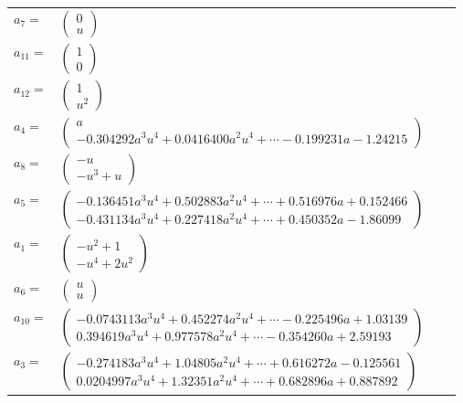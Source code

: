 \documentclass[1p]{elsarticle_modified}
\theoremstyle{definition}
\begin{document}
\begin{tabular}{m{7pt} m{180pt} m{7pt} m{180pt} }
\flushright $a_{7}=$&$\begin{pmatrix}0\\u\end{pmatrix}$ \\
\flushright $a_{11}=$&$\begin{pmatrix}1\\0\end{pmatrix}$ \\
\flushright $a_{12}=$&$\begin{pmatrix}1\\u^2\end{pmatrix}$ \\
\flushright $a_{4}=$&$\begin{pmatrix}a\\-0.304292 a^{3} u^{4}+0.0416400 a^{2} u^{4}+\cdots-0.199231 a-1.24215\end{pmatrix}$ \\
\flushright $a_{8}=$&$\begin{pmatrix}- u\\- u^3+u\end{pmatrix}$ \\
\flushright $a_{5}=$&$\begin{pmatrix}-0.136451 a^{3} u^{4}+0.502883 a^{2} u^{4}+\cdots+0.516976 a+0.152466\\-0.431134 a^{3} u^{4}+0.227418 a^{2} u^{4}+\cdots+0.450352 a-1.86099\end{pmatrix}$ \\
\flushright $a_{1}=$&$\begin{pmatrix}- u^2+1\\- u^4+2 u^2\end{pmatrix}$ \\
\flushright $a_{6}=$&$\begin{pmatrix}u\\u\end{pmatrix}$ \\
\flushright $a_{10}=$&$\begin{pmatrix}-0.0743113 a^{3} u^{4}+0.452274 a^{2} u^{4}+\cdots-0.225496 a+1.03139\\0.394619 a^{3} u^{4}+0.977578 a^{2} u^{4}+\cdots-0.354260 a+2.59193\end{pmatrix}$ \\
\flushright $a_{3}=$&$\begin{pmatrix}-0.274183 a^{3} u^{4}+1.04805 a^{2} u^{4}+\cdots+0.616272 a-0.125561\\0.0204997 a^{3} u^{4}+1.32351 a^{2} u^{4}+\cdots+0.682896 a+0.887892\end{pmatrix}$ \\

\end{tabular}
\end{document}
